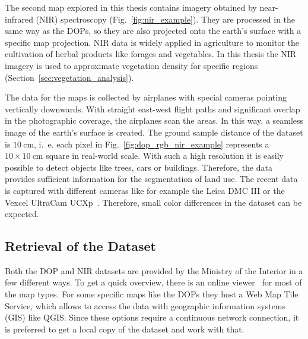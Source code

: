 The second map explored in this thesis contains imagery obtained by near-infrared (NIR) spectroscopy (Fig.~\ref{fig:nir_example}). They are processed in the same way as the DOPs, so they are also projected onto the earth's surface with a specific map projection. NIR data is widely applied in agriculture to monitor the cultivation of herbal products like forages and vegetables. In this thesis the NIR imagery is used to approximate vegetation density for specific regions (Section~\ref{sec:vegetation_analysis}).

The data for the maps is collected by airplanes with special cameras pointing vertically downwards. With straight east-west flight paths and significant overlap in the photographic coverage, the airplanes scan the areas. In this way, a seamless image of the earth's surface is created. The ground sample distance of the dataset is $10~\text{cm}$, i.~e. each pixel in Fig.~\ref{fig:dop_rgb_nir_example} represents a $10\times 10~\text{cm}$ square in real-world scale. With such a high resolution it is easily possible to detect objects like trees, cars or buildings. Therefore, the data provides sufficient information for the segmentation of land use. The recent data is captured with different cameras like for example the Leica DMC III or the Vexcel UltraCam UCXp~\cite{topo-image16}. Therefore, small color differences in the dataset can be expected.

\subsection{Retrieval of the Dataset}
Both the DOP and NIR datasets are provided by the Ministry of the Interior in a few different ways. To get a quick overview, there is an online viewer~\cite{tim_online20} for most of the map types. For some specific maps like the DOPs they host a Web Map Tile Service, which allows to access the data with geographic information systems (GIS) like QGIS. Since these options require a continuous network connection, it is preferred to get a local copy of the dataset and work with that.


